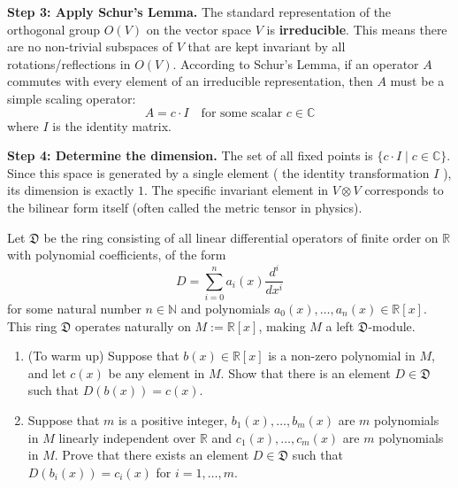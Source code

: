 \begin{solution}
\textbf{Step 3: Apply Schur's Lemma.}
The standard representation of the orthogonal group $O(V)$ on the vector space $V$ is \textbf{irreducible}. This means there are no non-trivial subspaces of $V$ that are kept invariant by all rotations/reflections in $O(V)$.
According to Schur's Lemma, if an operator $A$ commutes with every element of an irreducible representation, then $A$ must be a simple scaling operator:
\[ A = c \cdot I \quad \text{for some scalar } c \in \mathbb{C} \]
where $I$ is the identity matrix.

\textbf{Step 4: Determine the dimension.}
The set of all fixed points is $\{ c \cdot I \mid c \in \mathbb{C} \}$. 
Since this space is generated by a single element ( the identity transformation $I$ ), its dimension is exactly $1$.
The specific invariant element in $V \otimes V$ corresponds to the bilinear form itself (often called the metric tensor in physics).
\end{solution}

\begin{exercise}
\label{algebra:2012:4}
Let $\mathfrak{D}$ be the ring consisting of all linear differential operators of finite order on $\mathbb{R}$ with polynomial coefficients, of the form
\[ D = \sum_{i=0}^n a_i(x) \frac{d^i}{dx^i} \]
for some natural number $n \in \mathbb{N}$ and polynomials $a_0(x), \dots, a_n(x) \in \mathbb{R}[x]$. This ring $\mathfrak{D}$ operates naturally on $M := \mathbb{R}[x]$, making $M$ a left $\mathfrak{D}$-module.
\begin{enumerate}
    \item (To warm up) Suppose that $b(x) \in \mathbb{R}[x]$ is a non-zero polynomial in $M$, and let $c(x)$ be any element in $M$. Show that there is an element $D \in \mathfrak{D}$ such that $D(b(x)) = c(x)$.
    \item Suppose that $m$ is a positive integer, $b_1(x), \dots, b_m(x)$ are $m$ polynomials in $M$ linearly independent over $\mathbb{R}$ and $c_1(x), \dots, c_m(x)$ are $m$ polynomials in $M$. Prove that there exists an element $D \in \mathfrak{D}$ such that $D(b_i(x)) = c_i(x)$ for $i = 1, \dots, m$.
\end{enumerate}
\end{exercise}

